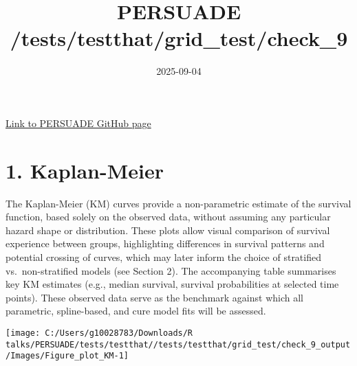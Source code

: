 \documentclass[
]{article}
\title{PERSUADE /tests/testthat/grid\_test/check\_9}
\author{}
\date{\vspace{-2.5em}2025-09-04}
\begin{document}
\maketitle

{
\hypersetup{linkcolor=}
\setcounter{tocdepth}{2}
\tableofcontents
}
\hfill\break

\href{https://github.com/Bram-R/PERSUADE}{Link to PERSUADE GitHub page}

\clearpage

\section{1. Kaplan-Meier}\label{kaplan-meier}

The Kaplan-Meier (KM) curves provide a non-parametric estimate of the
survival function, based solely on the observed data, without assuming
any particular hazard shape or distribution. These plots allow visual
comparison of survival experience between groups, highlighting
differences in survival patterns and potential crossing of curves, which
may later inform the choice of stratified vs.~non-stratified models (see
Section 2). The accompanying table summarises key KM estimates (e.g.,
median survival, survival probabilities at selected time points). These
observed data serve as the benchmark against which all parametric,
spline-based, and cure model fits will be assessed.

\clearpage

\begin{flushleft}\texttt{[image: C:/Users/g10028783/Downloads/R talks/PERSUADE/tests/testthat//tests/testthat/grid\_test/check\_9\_output/Images/Figure\_plot\_KM-1]} \end{flushleft}

\begin{table}[H]
\centering
\caption{\label{tab:Table_1}Observed survival data}
\centering
{}
\end{table}
\end{document}

